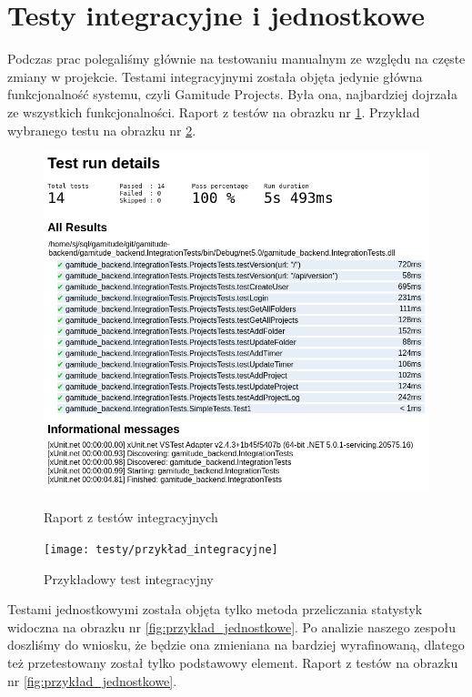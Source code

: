 \documentclass[a4paper,11pt]{report}
\begin{document}
\section{Testy integracyjne i jednostkowe}
Podczas prac polegaliśmy głównie na testowaniu manualnym ze względu na częste zmiany w projekcie.
Testami integracyjnymi została objęta jedynie główna funkcjonalność systemu, czyli Gamitude Projects.
Była ona, najbardziej dojrzała ze wszystkich funkcjonalności.
Raport z testów na obrazku nr \ref{fig:integracyjne}.
Przykład wybranego testu na obrazku nr \ref{fig:przykład_integracyjne}.
\begin{figure}[H]
	\centering
	\includegraphics[scale=0.35]{testy/integracyjne}\\
	\caption{Raport z testów integracyjnych}
	\label{fig:integracyjne}
\end{figure}
\begin{figure}[H]
	\centering
	\texttt{[image: testy/przykład\_integracyjne]}\\
	\caption{Przykładowy test integracyjny}
	\label{fig:przykład_integracyjne}
\end{figure}
Testami jednostkowymi została objęta tylko metoda przeliczania statystyk widoczna na obrazku nr \ref{fig:przykład_jednostkowe}.
Po analizie naszego zespołu doszliśmy do wniosku, że będzie ona zmieniana na bardziej wyrafinowaną, dlatego też przetestowany został tylko podstawowy element.
Raport z testów na obrazku nr \ref{fig:przykład_jednostkowe}.
\end{document}
